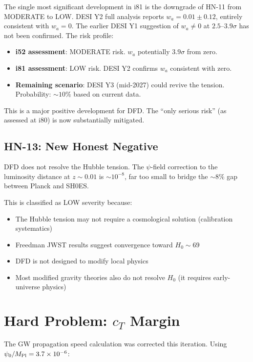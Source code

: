 \documentclass[11pt,a4paper]{article}
\begin{document}
The single most significant development in i81 is the downgrade of HN-11 from MODERATE to LOW. DESI Y2 full analysis reports $w_a = 0.01 \pm 0.12$, entirely consistent with $w_a = 0$. The earlier DESI Y1 suggestion of $w_a \neq 0$ at $2.5$--$3.9\sigma$ has not been confirmed. The risk profile:

\begin{itemize}[nosep]
\item \textbf{i52 assessment}: MODERATE risk. $w_a$ potentially $3.9\sigma$ from zero.
\item \textbf{i81 assessment}: LOW risk. DESI Y2 confirms $w_a$ consistent with zero.
\item \textbf{Remaining scenario}: DESI Y3 (mid-2027) could revive the tension. Probability: $\sim 10\%$ based on current data.
\end{itemize}

This is a major positive development for DFD. The ``only serious risk'' (as assessed at i80) is now substantially mitigated.

\subsection{HN-13: New Honest Negative}

DFD does not resolve the Hubble tension. The $\psi$-field correction to the luminosity distance at $z \sim 0.01$ is $\sim 10^{-8}$, far too small to bridge the $\sim 8\%$ gap between Planck and SH0ES.

This is classified as LOW severity because:
\begin{itemize}[nosep]
\item The Hubble tension may not require a cosmological solution (calibration systematics)
\item Freedman JWST results suggest convergence toward $H_0 \sim 69$
\item DFD is not designed to modify local physics
\item Most modified gravity theories also do not resolve $H_0$ (it requires early-universe physics)
\end{itemize}

\section{Hard Problem: $c_T$ Margin}

The GW propagation speed calculation was corrected this iteration. Using $\psi_0/M_{\rm Pl} = 3.7 \times 10^{-6}$:
\end{document}
